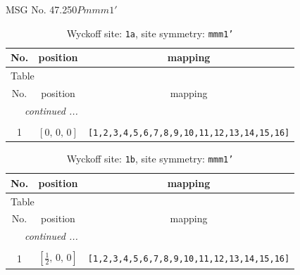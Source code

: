 \documentclass[fleqn,8pt]{jsarticle}
\begin{document}
\setcounter{MaxMatrixCols}{32}

\renewcommand{\tablename}{Table~}
\renewcommand{\figurename}{Figure~}
\begin{center}
\LARGE
MSG No. 47.250\quad$Pmmm1'$
\end{center}
\renewcommand{\arraystretch}{1.2}
\begin{longtable}{ccc}
\caption{Wyckoff site: {\tt 1a}, site symmetry: {\tt mmm1'}}
 \\
 \hline \hline
No. & position & mapping \\ \hline \endfirsthead

\multicolumn{2}{l}{\tablename\ \thetable{}} \\
 \hline \hline
No. & position & mapping \\ \hline \endhead

 \hline \hline
\multicolumn{2}{r}{\footnotesize\it continued ...} \\ \endfoot

 \hline \hline
\multicolumn{2}{r}{} \\ \endlastfoot

1 & $\left[ 0,\, 0,\, 0 \right]$ & {\tt [1,2,3,4,5,6,7,8,9,10,11,12,13,14,15,16]} \\
\end{longtable}
\renewcommand{\arraystretch}{1.2}
\begin{longtable}{ccc}
\caption{Wyckoff site: {\tt 1b}, site symmetry: {\tt mmm1'}}
 \\
 \hline \hline
No. & position & mapping \\ \hline \endfirsthead

\multicolumn{2}{l}{\tablename\ \thetable{}} \\
 \hline \hline
No. & position & mapping \\ \hline \endhead

 \hline \hline
\multicolumn{2}{r}{\footnotesize\it continued ...} \\ \endfoot

 \hline \hline
\multicolumn{2}{r}{} \\ \endlastfoot

1 & $\left[ \frac{1}{2},\, 0,\, 0 \right]$ & {\tt [1,2,3,4,5,6,7,8,9,10,11,12,13,14,15,16]} \\
\end{longtable}
\renewcommand{\arraystretch}{1.2}
\end{document}
